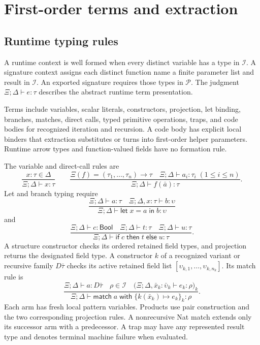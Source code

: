 \documentclass[11pt]{article}
\newcommand{\code}[1]{\texttt{\seqsplit{#1}}}
\newcommand{\ty}[1]{\mathsf{#1}}
\newcommand{\I}{\mathcal{I}}
\newcommand{\Pp}{\mathcal{P}}
\begin{document}
\section{First-order terms and extraction}

\subsection{Runtime typing rules}

A runtime context is well formed when every distinct variable has a type in $\I$.  A signature context assigns each distinct function name a finite parameter list and result in $\I$.  An exported signature requires those types in $\Pp$.  The judgment $\Xi;\Delta\vdash e:\tau$ describes the abstract runtime term presentation.

Terms include variables, scalar literals, constructors, projection, let binding, branches, matches, direct calls, typed primitive operations, traps, and code bodies for recognized iteration and recursion.  A code body has explicit local binders that extraction substitutes or turns into first-order helper parameters.  Runtime arrow types and function-valued fields have no formation rule.

The variable and direct-call rules are
\[
\frac{x:\tau\in\Delta}{\Xi;\Delta\vdash x:\tau}
\qquad
\frac{\Xi(f)=(\tau_1,\ldots,\tau_n)\to\tau\quad
      \Xi;\Delta\vdash a_i:\tau_i\;(1\le i\le n)}
     {\Xi;\Delta\vdash f(\bar a):\tau}.
\]
Let and branch typing require
\[
\frac{\Xi;\Delta\vdash a:\tau\quad\Xi;\Delta,x:\tau\vdash b:\upsilon}
     {\Xi;\Delta\vdash\ty{let}\;x=a\;\ty{in}\;b:\upsilon}
\]
and
\[
\frac{\Xi;\Delta\vdash c:\ty{Bool}\quad
      \Xi;\Delta\vdash t:\tau\quad\Xi;\Delta\vdash u:\tau}
     {\Xi;\Delta\vdash\ty{if}\;c\;\ty{then}\;t\;\ty{else}\;u:\tau}.
\]
A structure constructor checks its ordered retained field types, and projection returns the designated field type.  A constructor $k$ of a recognized variant or recursive family $D\bar\tau$ checks its active retained field list $[\upsilon_{k,1},\ldots,\upsilon_{k,n_k}]$.  Its match rule is
\[
\frac{\Xi;\Delta\vdash a:D\bar\tau\quad\rho\in\I\quad
 \bigl(\Xi;\Delta,\bar x_k:\bar\upsilon_k\vdash e_k:\rho\bigr)_{k}}
 {\Xi;\Delta\vdash\ty{match}\;a\;\ty{with}\;\{k(\bar x_k)\mapsto e_k\}_k:\rho}.
\]
Each arm has fresh local pattern variables.  Products use pair construction and the two corresponding projection rules.  A nonrecursive Nat match extends only its successor arm with a \code{Nat64} predecessor.  A trap may have any represented result type and denotes terminal machine failure when evaluated.
\end{document}
